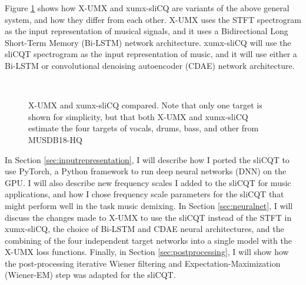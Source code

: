 \documentclass[report.tex]{subfiles}
\begin{document}
Figure \ref{fig:umxandxumxslicq} shows how X-UMX and xumx-sliCQ are variants of the above general system, and how they differ from each other. X-UMX uses the STFT spectrogram as the input representation of musical signals, and it uses a Bidirectional Long Short-Term Memory (Bi-LSTM) network architecture. xumx-sliCQ will use the sliCQT spectrogram as the input representation of music, and it will use either a Bi-LSTM or convolutional denoising autoencoder (CDAE) network architecture.

\begin{figure}[ht]
	\centering
	\\
	\caption{X-UMX and xumx-sliCQ compared. Note that only one target is shown for simplicity, but that both X-UMX and xumx-sliCQ estimate the four targets of vocals, drums, bass, and other from MUSDB18-HQ}
	\label{fig:umxandxumxslicq}
\end{figure}

In Section \ref{sec:inputrepresentation}, I will describe how I ported the sliCQT to use PyTorch, a Python framework to run deep neural networks (DNN) on the GPU. I will also describe new frequency scales I added to the sliCQT for music applications, and how I chose frequency scale parameters for the sliCQT that might perform well in the task music demixing. In Section \ref{sec:neuralnet}, I will discuss the changes made to X-UMX to use the sliCQT instead of the STFT in xumx-sliCQ, the choice of Bi-LSTM and CDAE neural architectures, and the combining of the four independent target networks into a single model with the X-UMX loss functions. Finally, in Section \ref{sec:postprocessing}, I will show how the post-processing iterative Wiener filtering and Expectation-Maximization (Wiener-EM) step was adapted for the sliCQT.
\end{document}
